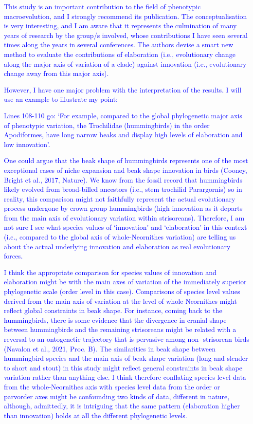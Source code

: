 \documentclass[12pt,letterpaper]{article}
\begin{document}
\textcolor{blue}{This study is an important contribution to the field of phenotypic macroevolution, and I strongly recommend its publication. The conceptualisation is very interesting, and I am aware that it represents the culmination of many years of research by the group/s involved, whose contributions I have seen several times along the years in several conferences. The authors devise a smart new method to evaluate the contributions of elaboration (i.e., evolutionary change along the major axis of variation of a clade) against innovation (i.e., evolutionary change away from this major axis).}

\textcolor{blue}{However, I have one major problem with the interpretation of the results. I will use an example to illustrate my point:}

\textcolor{blue}{Lines 108-110 go: ‘For example, compared to the global phylogenetic major axis of phenotypic variation, the Trochilidae (hummingbirds) in the order Apodiformes, have long narrow beaks and display high levels of elaboration and low innovation’.}

\textcolor{blue}{One could argue that the beak shape of hummingbirds represents one of the most exceptional cases of niche expansion and beak shape innovation in birds (Cooney, Bright et al., 2017, Nature). We know from the fossil record that hummingbirds likely evolved from broad-billed ancestors (i.e., stem trochilid Parargornis) so in reality, this comparison might not faithfully represent the actual evolutionary process undergone by crown group hummingbirds (high innovation as it departs from the main axis of evolutionary variation within strisoreans). Therefore, I am not sure I see what species values of ‘innovation’ and ‘elaboration’ in this context (i.e., compared to the global axis of whole-Neornithes variation) are telling us about the actual underlying innovation and elaboration as real evolutionary forces.}

\textcolor{blue}{I think the appropriate comparison for species values of innovation and elaboration might be with the main axes of variation of the immediately superior phylogenetic scale (order level in this case). Comparisons of species level values derived from the main axis of variation at the level of whole Neornithes might reflect global constraints in beak shape. For instance, coming back to the hummingbirds, there is some evidence that the divergence in cranial shape between hummingbirds and the remaining strisoreans might be related with a reversal to an ontogenetic trajectory that is pervasive among non- strisorean birds (Navalon et al., 2021, Proc. B). The similarities in beak shape between hummingbird species and the main axis of beak shape variation (long and slender to short and stout) in this study might reflect general constraints in beak shape variation rather than anything else. I think therefore conflating species level data from the whole-Neornithes axis with species level data from the order or parvorder axes might be confounding two kinds of data, different in nature, although, admittedly, it is intriguing that the same pattern (elaboration higher than innovation) holds at all the different phylogenetic levels.}
\end{document}
